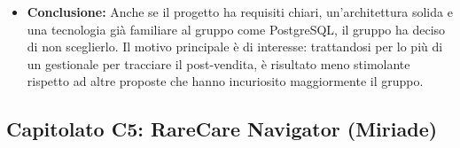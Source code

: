 \documentclass[12pt,a4paper]{article}
\begin{document}
\begin{itemize}
\begin{itemize}
  \end{itemize}
\item \textbf{Conclusione:} Anche se il progetto ha requisiti chiari, un'architettura solida e una tecnologia già familiare al gruppo come PostgreSQL, il gruppo ha deciso di non sceglierlo. Il motivo principale è di interesse: trattandosi per lo più di un gestionale per tracciare il post-vendita, è risultato meno stimolante rispetto ad altre proposte che hanno incuriosito maggiormente il gruppo.

\end{itemize}

\hypertarget{capitolato-c5}{%
\subsection{Capitolato C5: RareCare Navigator (Miriade)}}
\end{document}
